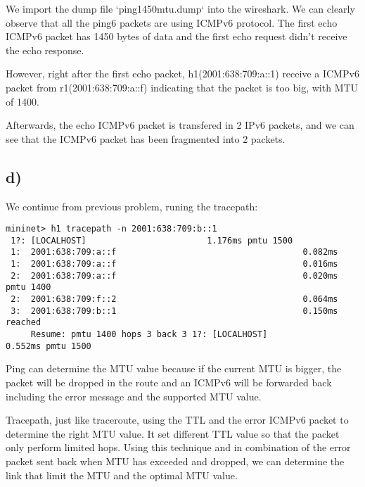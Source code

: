 \documentclass{article}
\begin{document}
We import the dump file `ping1450mtu.dump` into the wireshark. We can clearly
observe that all the ping6 packets are using ICMPv6 protocol. The first echo
ICMPv6 packet has 1450 bytes of data and the first echo
request didn't receive the echo response.

However, right after the first echo packet, h1(2001:638:709:a::1) receive
a ICMPv6 packet from r1(2001:638:709:a::f)
indicating that the packet is too big, with MTU of 1400.

Afterwards, the echo ICMPv6 packet is transfered in 2 IPv6 packets, and we
can see that the ICMPv6 packet has been fragmented into 2 packets.
\subsection*{d)}
We continue from previous problem, runing the tracepath:
\begin{verbatim}
mininet> h1 tracepath -n 2001:638:709:b::1
 1?: [LOCALHOST]                        1.176ms pmtu 1500
 1:  2001:638:709:a::f                                     0.082ms
 1:  2001:638:709:a::f                                     0.016ms
 2:  2001:638:709:a::f                                     0.020ms pmtu 1400
 2:  2001:638:709:f::2                                     0.064ms
 3:  2001:638:709:b::1                                     0.150ms reached
     Resume: pmtu 1400 hops 3 back 3 1?: [LOCALHOST]                        0.552ms pmtu 1500
\end{verbatim}
Ping can determine the MTU value because if the current MTU is bigger, the
packet will be dropped in the route and an ICMPv6 will be forwarded back
including the error message and the supported MTU value.

Tracepath, just like traceroute\cite{slashroot.in}, using the TTL and the error ICMPv6 packet to
determine the right MTU value. It set different TTL value so that the packet
only perform limited hops. Using this technique and in combination of the error
packet sent back when MTU has exceeded and dropped, we can determine the link
that limit the MTU and the optimal MTU value.
\end{document}
